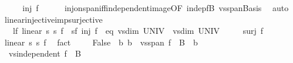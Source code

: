 \begin{isabellebody}
\ \ \isamarkupfalse%
\ \isamarkupfalse%
\ {\isachardoublequoteopen}inj\ f{\isachardoublequoteclose}\isanewline
\ \ \ \ \isamarkupfalse%
\ inj{\isacharunderscore}{\kern0pt}on{\isacharunderscore}{\kern0pt}span{\isacharunderscore}{\kern0pt}iff{\isacharunderscore}{\kern0pt}independent{\isacharunderscore}{\kern0pt}image{\isacharbrackleft}{\kern0pt}OF\ indep{\isacharunderscore}{\kern0pt}fB{\isacharbrackright}{\kern0pt}\ vs{}{\isachardot}{\kern0pt}span{\isacharunderscore}{\kern0pt}Basis\ \isamarkupfalse%
\ auto\isanewline
{}\isamarkupfalse%
%
\endisatagproof
{\isafoldproof}%
%
\isadelimproof
\isanewline
%
\endisadelimproof
\isanewline
{}\isamarkupfalse%
\ linear{\isacharunderscore}{\kern0pt}injective{\isacharunderscore}{\kern0pt}imp{\isacharunderscore}{\kern0pt}surjective{\isacharcolon}{\kern0pt}\isanewline
\ \ \ lf{\isacharcolon}{\kern0pt}\ {\isachardoublequoteopen}linear\ s{}\ s{}\ f{\isachardoublequoteclose}\ \ sf{\isacharcolon}{\kern0pt}\ {\isachardoublequoteopen}inj\ f{\isachardoublequoteclose}\ \ eq{\isacharcolon}{\kern0pt}\ {\isachardoublequoteopen}vs{}{\isachardot}{\kern0pt}dim\ UNIV\ {\isacharequal}{\kern0pt}\ vs{}{\isachardot}{\kern0pt}dim\ UNIV{\isachardoublequoteclose}\isanewline
\ \ \ \ \ {\isachardoublequoteopen}surj\ f{\isachardoublequoteclose}\isanewline
%
\isadelimproof
%
\endisadelimproof
%
\isatagproof
{}\isamarkupfalse%
\ {\isacharminus}{\kern0pt}\isanewline
\ \ \isamarkupfalse%
\ linear\ s{}\ s{}\ f\ \isamarkupfalse%
\ fact\isanewline
\ \ \isamarkupfalse%
\ {\isacharasterisk}{\kern0pt}{\isacharcolon}{\kern0pt}\ False\ \ b{\isacharcolon}{\kern0pt}\ {\isachardoublequoteopen}b\ {\isasymnotin}\ vs{}{\isachardot}{\kern0pt}span\ {\isacharparenleft}{\kern0pt}f\ {\isacharbackquote}{\kern0pt}\ B{}{\isacharparenright}{\kern0pt}{\isachardoublequoteclose}\ \ b\isanewline
\ \ \isamarkupfalse%
\ {\isacharminus}{\kern0pt}\isanewline
\ \ \ \ \isamarkupfalse%
\ {\isacharasterisk}{\kern0pt}{\isacharcolon}{\kern0pt}\ {\isachardoublequoteopen}vs{}{\isachardot}{\kern0pt}independent\ {\isacharparenleft}{\kern0pt}f\ {\isacharbackquote}{\kern0pt}\ B{}{\isacharparenright}{\kern0pt}{\isachardoublequoteclose}\isanewline
\ \ \ \ \ \ \isamarkupfalse%

\end{isabellebody}
